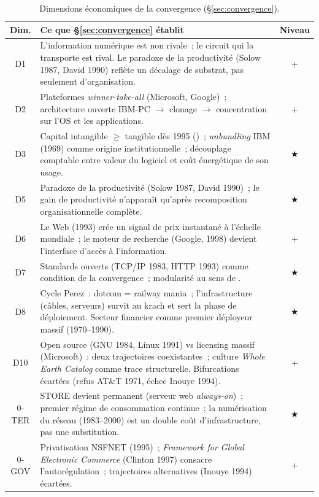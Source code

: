 \begin{table}[htbp]
\caption{Dimensions économiques de la convergence (§\ref{sec:convergence}).}\label{tab:convergence-dimensions}
\centering\small
\renewcommand{\arraystretch}{1.15}
\begin{tabularx}{\textwidth}{@{}cXc@{}}
\toprule
\textbf{Dim.} & \textbf{Ce que §\ref{sec:convergence} établit} & \textbf{Niveau} \\
\midrule
D1 & L'information numérique est non rivale~; le circuit qui la transporte est rival. Le paradoxe de la productivité (Solow 1987, David 1990) reflète un décalage de substrat, pas seulement d'organisation. & + \\
D2 & Plateformes \emph{winner-take-all} (Microsoft, Google)~; architecture ouverte IBM-PC $\rightarrow$ clonage $\rightarrow$ concentration sur l'OS et les applications. & + \\
D3 & Capital intangible $\geq$ tangible dès 1995 (\textcite{corrado_intangible_2009})~; \emph{unbundling} IBM (1969) comme origine institutionnelle~; découplage comptable entre valeur du logiciel et coût énergétique de son usage. & ★ \\
D5 & Paradoxe de la productivité (Solow 1987, David 1990)~; le gain de productivité n'apparaît qu'après recomposition organisationnelle complète. & ★ \\
D6 & Le Web (1993) crée un signal de prix instantané à l'échelle mondiale~; le moteur de recherche (Google, 1998) devient l'interface d'accès à l'information. & + \\
D7 & Standards ouverts (TCP/IP 1983, HTTP 1993) comme condition de la convergence~; modularité au sens de \textcite{langlois_modularity_2003}. & ★ \\
D8 & Cycle Perez~: dotcom = railway mania~; l'infrastructure (câbles, serveurs) survit au krach et sert la phase de déploiement. Secteur financier comme premier déployeur massif (1970--1990). & ★ \\
D10 & Open source (GNU 1984, Linux 1991) vs licensing massif (Microsoft)~: deux trajectoires coexistantes~; culture \emph{Whole Earth Catalog} comme trace structurelle. Bifurcations écartées (refus AT\&T 1971, échec Inouye 1994). & + \\
\midrule
0-TER & STORE devient permanent (serveur web \emph{always-on})~; premier régime de consommation continue~; la numérisation du réseau (1983--2000) est un double coût d'infrastructure, pas une substitution. & ★ \\
0-GOV & Privatisation NSFNET (1995)~; \emph{Framework for Global Electronic Commerce} (Clinton 1997) consacre l'autorégulation~; trajectoires alternatives (Inouye 1994) écartées. & + \\
\bottomrule
\end{tabularx}
\renewcommand{\arraystretch}{1.0}
\end{table}
